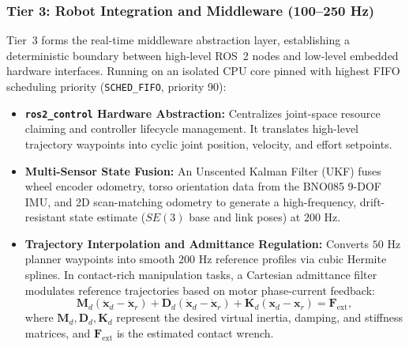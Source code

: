 \subsubsection{Tier 3: Robot Integration and Middleware (100--250 Hz)}
Tier~3 forms the real-time middleware abstraction layer, establishing a deterministic boundary between high-level ROS~2 nodes and low-level embedded hardware interfaces. Running on an isolated CPU core pinned with highest FIFO scheduling priority (\texttt{SCHED\_FIFO}, priority 90):
\begin{itemize}[leftmargin=1.5em]
  \item \textbf{\texttt{ros2\_control} Hardware Abstraction:} Centralizes joint-space resource claiming and controller lifecycle management. It translates high-level trajectory waypoints into cyclic joint position, velocity, and effort setpoints.
  \item \textbf{Multi-Sensor State Fusion:} An Unscented Kalman Filter (UKF) fuses wheel encoder odometry, torso orientation data from the BNO085 9-DOF IMU, and 2D scan-matching odometry to generate a high-frequency, drift-resistant state estimate ($SE(3)$ base and link poses) at $200\text{ Hz}$.
  \item \textbf{Trajectory Interpolation and Admittance Regulation:} Converts $50\text{ Hz}$ planner waypoints into smooth $200\text{ Hz}$ reference profiles via cubic Hermite splines. In contact-rich manipulation tasks, a Cartesian admittance filter modulates reference trajectories based on motor phase-current feedback:
  \begin{equation}
    \mathbf{M}_d (\ddot{\mathbf{x}}_d - \ddot{\mathbf{x}}_r) + \mathbf{D}_d (\dot{\mathbf{x}}_d - \dot{\mathbf{x}}_r) + \mathbf{K}_d (\mathbf{x}_d - \mathbf{x}_r) = \mathbf{F}_{\text{ext}},
    \label{eq:admittance_filter}
  \end{equation}
  where $\mathbf{M}_d, \mathbf{D}_d, \mathbf{K}_d$ represent the desired virtual inertia, damping, and stiffness matrices, and $\mathbf{F}_{\text{ext}}$ is the estimated contact wrench.
\end{itemize}

